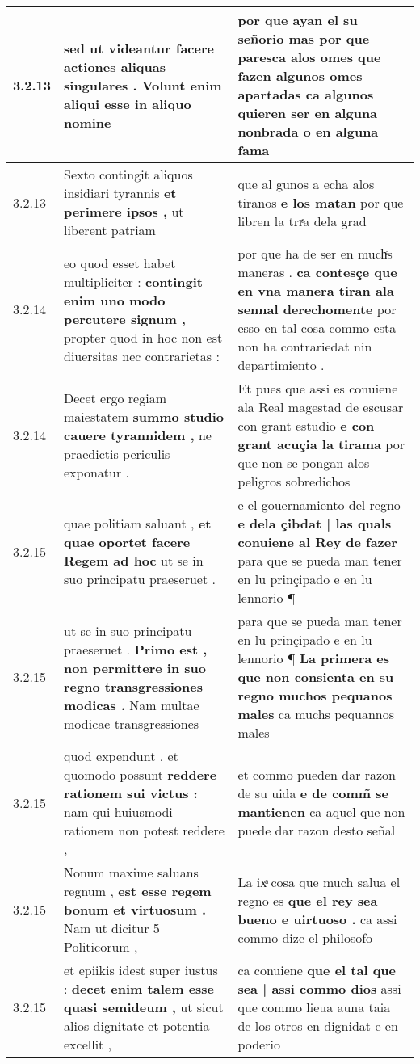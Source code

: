 \begin{tabular}{|p{1cm}|p{6.5cm}|p{6.5cm}|}
3.2.13 & sed ut videantur \textbf{ facere actiones aliquas singulares . } Volunt enim aliqui esse in aliquo nomine & por que ayan el su señorio mas por que paresca alos omes \textbf{ que fazen algunos omes apartadas } ca algunos quieren ser en alguna nonbrada o en alguna fama \\\hline
3.2.13 & Sexto contingit aliquos insidiari tyrannis \textbf{ et perimere ipsos , } ut liberent patriam & que al gunos a echa alos tiranos \textbf{ e los matan } por que libren la trrͣa dela grad \\\hline
3.2.14 & eo quod esset habet multipliciter : \textbf{ contingit enim uno modo percutere signum , } propter quod in hoc non est diuersitas nec contrarietas : & por que ha de ser en muchͣs maneras . \textbf{ ca contesçe que en vna manera tiran ala sennal derechomente } por esso en tal cosa commo esta non ha contrariedat nin departimiento . \\\hline
3.2.14 & Decet ergo regiam maiestatem \textbf{ summo studio cauere tyrannidem , } ne praedictis periculis exponatur . & Et pues que assi es conuiene ala Real magestad de escusar con grant estudio \textbf{ e con grant acuçia la tirama } por que non se pongan alos peligros sobredichos \\\hline
3.2.15 & quae politiam saluant , \textbf{ et quae oportet facere Regem ad hoc } ut se in suo principatu praeseruet . & e el gouernamiento del regno \textbf{ e dela çibdat | las quals conuiene al Rey de fazer } para que se pueda man tener en lu prinçipado e en lu lennorio ¶ \\\hline
3.2.15 & ut se in suo principatu praeseruet . \textbf{ Primo est , non permittere in suo regno transgressiones modicas . } Nam multae modicae transgressiones & para que se pueda man tener en lu prinçipado e en lu lennorio ¶ \textbf{ La primera es que non consienta en su regno muchos pequanos males } ca muchs pequannos males \\\hline
3.2.15 & quod expendunt , et quomodo possunt \textbf{ reddere rationem sui victus : } nam qui huiusmodi rationem non potest reddere , & et commo pueden dar razon de su uida \textbf{ e de comm̃ se mantienen } ca aquel que non puede dar razon desto señal \\\hline
3.2.15 & Nonum maxime saluans regnum , \textbf{ est esse regem bonum et virtuosum . } Nam ut dicitur 5 Politicorum , & La ixͣ cosa que much salua el regno es \textbf{ que el rey sea bueno e uirtuoso . } ca assi commo dize el philosofo \\\hline
3.2.15 & et epiikis idest super iustus : \textbf{ decet enim talem esse quasi semideum , } ut sicut alios dignitate et potentia excellit , & ca conuiene \textbf{ que el tal que sea | assi commo dios } assi que commo lieua auna taia de los otros en dignidat e en poderio \\\hline

\end{tabular}
